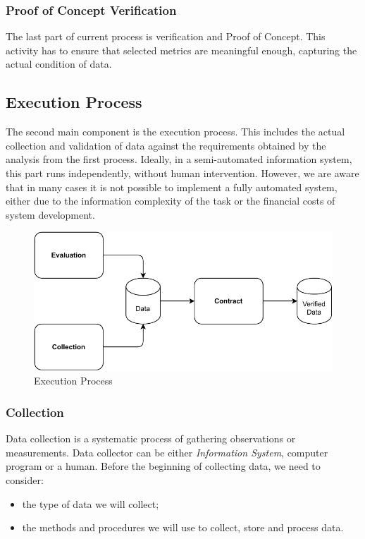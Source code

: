 \subsubsection{Proof of Concept Verification}

The last part of current process is verification and Proof of Concept.
This activity has to ensure that selected metrics are meaningful enough, capturing the actual condition of data.

\subsection{Execution Process}

The second main component is the execution process.
This includes the actual collection and validation of data against the requirements obtained by the analysis from the first process.
Ideally, in a semi-automated information system, this part runs independently, without human intervention.
However, we are aware that in many cases it is not possible to implement a fully automated system, either due to the information complexity of the task or the financial costs of system development.

\begin{figure}[htb]
    \centering
    \includegraphics[width=.8\textwidth]{figures/execution-process.pdf}
    \caption{Execution Process}
    \label{fig:execution-process}
\end{figure}
\FloatBarrier

\subsubsection{Collection}

Data collection is a systematic process of gathering observations or measurements.
Data collector can be either \textit{Information System}, computer program or a human.
Before the beginning of collecting data, we need to consider:

\begin{itemize}
    \item the type of data we will collect;
    \item the methods and procedures we will use to collect, store and process data.
\end{itemize}

